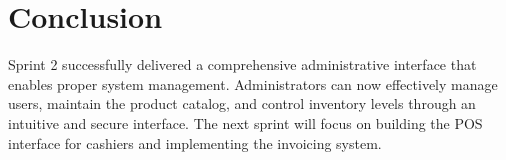 \section{Conclusion}

Sprint 2 successfully delivered a comprehensive administrative interface that enables proper system management. Administrators can now effectively manage users, maintain the product catalog, and control inventory levels through an intuitive and secure interface. The next sprint will focus on building the POS interface for cashiers and implementing the invoicing system.
